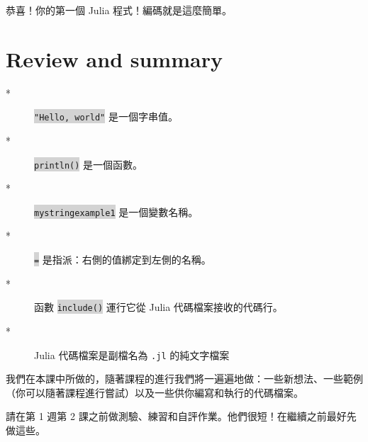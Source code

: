 \documentclass[]{article}
\begin{document}
恭喜！你的第一個 Julia 程式！編碼就是這麼簡單。

\section*{Review and summary }

\begin{description}
	\item[*] \colorbox{lightgray}{\tt "Hello, world"} 是一個字串值。
	\item[*] \colorbox{lightgray}{\tt println()} 是一個函數。
	\item[*] \colorbox{lightgray}{\tt mystringexample1} 是一個變數名稱。
	\item[*] \colorbox{lightgray}{\tt =} 是指派：右側的值綁定到左側的名稱。
	\item[*] 函數 \colorbox{lightgray}{\tt include()} 運行它從 Julia 代碼檔案接收的代碼行。
	\item[*] Julia 代碼檔案是副檔名為 {\tt .jl} 的純文字檔案
\end{description}

我們在本課中所做的，隨著課程的進行我們將一遍遍地做：一些新想法、一些範例（你可以隨著課程進行嘗試）以及一些供你編寫和執行的代碼檔案。

請在第 1 週第 2 課之前做測驗、練習和自評作業。他們很短！在繼續之前最好先做這些。
\end{document}
